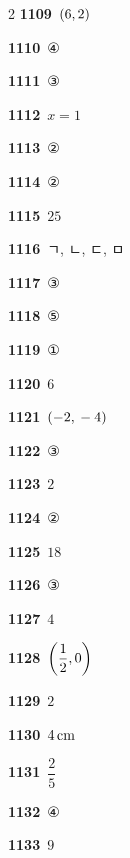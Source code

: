 \documentclass[10pt,a4paper]{article}
\begin{document}
\begin{multicols}{2}
\noindent\textbf{1109}\ $(6{,}\mkern3mu 2)$\par
\noindent\textbf{1110}\ ④\par
\noindent\textbf{1111}\ ③\par
\noindent\textbf{1112}\ $x=1$\par
\noindent\textbf{1113}\ ②\par
\noindent\textbf{1114}\ ②\par
\noindent\textbf{1115}\ $25$\par
\noindent\textbf{1116}\ ㄱ, ㄴ, ㄷ, ㅁ\par
\noindent\textbf{1117}\ ③\par
\noindent\textbf{1118}\ ⑤\par
\noindent\textbf{1119}\ ①\par
\noindent\textbf{1120}\ $6$\par
\noindent\textbf{1121}\ $(-2{,}\mkern3mu -4)$\par
\noindent\textbf{1122}\ ③\par
\noindent\textbf{1123}\ $2$\par
\noindent\textbf{1124}\ ②\par
\noindent\textbf{1125}\ $18$\par
\noindent\textbf{1126}\ ③\par
\noindent\textbf{1127}\ $4$\par
\noindent\textbf{1128}\ $\left(\dfrac{1}{2}{,}\mkern3mu 0\right)$\par
\noindent\textbf{1129}\ $2$\par
\noindent\textbf{1130}\ $4\mkern3mu \mathrm{cm}$\par
\noindent\textbf{1131}\ $\dfrac{2}{5}$\par
\noindent\textbf{1132}\ ④\par
\noindent\textbf{1133}\ $9$\par
\end{multicols}
\end{document}
